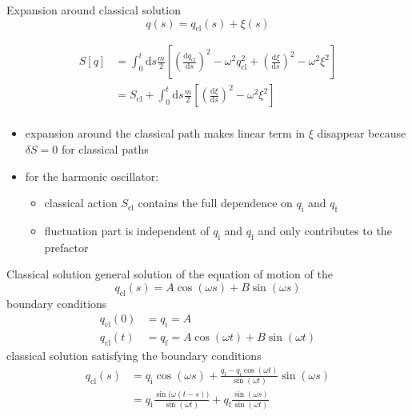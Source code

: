 \documentclass[t,dvipsnames]{beamer}
\begin{document}
\begin{frame}[t]{Expansion around classical solution}
 \begin{displaymath}
  q(s) = q_\text{cl}(s)+\xi(s)
 \end{displaymath}

 \begin{displaymath}
  \begin{aligned}
   S[q] &= \int_0^t\text{d}s\frac{m}{2}
	   \left[\left(\frac{\text{d}q_\text{cl}}{\text{d}s}\right)^2-\omega^2q_\text{cl}^2
	   +\left(\frac{\text{d}\xi}{\text{d}s}\right)^2-\omega^2\xi^2\right]\\
        &= S_\text{cl} + \int_0^t\text{d}s\frac{m}{2}\left[
	   \left(\frac{\text{d}\xi}{\text{d}s}\right)^2-\omega^2\xi^2\right]\\
  \end{aligned}
 \end{displaymath}

 \begin{itemize}
  \item expansion around the classical path makes linear term in $\xi$ disappear because
	$\delta S=0$ for classical paths
  \item for the harmonic oscillator:
	\begin{itemize}
	 \item classical action $S_\text{cl}$ contains the full dependence on $q_\text{i}$
	       and $q_\text{f}$
	 \item fluctuation part is independent of $q_\text{i}$ and $q_\text{f}$ and only
	       contributes to the prefactor
	\end{itemize}
 \end{itemize}
\end{frame}

\begin{frame}[t]{Classical solution}
 general solution of the equation of motion of the 
 \begin{displaymath}
  q_\text{cl}(s) = A\cos(\omega s) + B\sin(\omega s)
 \end{displaymath}
 boundary conditions
 \begin{displaymath}
  \begin{aligned}
   q_\text{cl}(0) &= q_\text{i} = A\\
   q_\text{cl}(t) &= q_\text{f} = A\cos(\omega t)+B\sin(\omega t)
  \end{aligned}
 \end{displaymath}
 classical solution satisfying the boundary conditions
 \begin{displaymath}
  \begin{aligned}
   q_\text{cl}(s) &= q_\text{i}\cos(\omega s)
		     + \frac{q_\text{f}-q_\text{i}\cos(\omega t)}{\sin(\omega t)}\sin(\omega s)\\
		  &= q_\text{i}\frac{\sin\big(\omega(t-s)\big)}{\sin(\omega t)}
		     + q_\text{f}\frac{\sin(\omega s)}{\sin(\omega t)}
  \end{aligned}
 \end{displaymath}
\end{frame}
\end{document}
